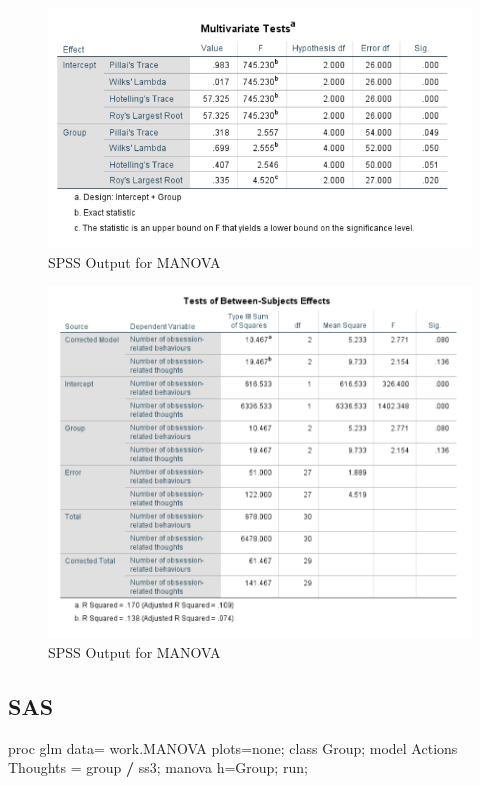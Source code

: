 \documentclass[
]{book}
\newenvironment{Shaded}{\begin{snugshade}}{\end{snugshade}}
\newcommand{\NormalTok}[1]{#1}
\newcommand{\OperatorTok}[1]{\textcolor[rgb]{0.81,0.36,0.00}{\textbf{#1}}}
\newcommand{\StringTok}[1]{\textcolor[rgb]{0.31,0.60,0.02}{#1}}
\begin{document}
\begin{figure}[!h]
\includegraphics{Screenshots/MANOVA/MANOVAspss} \caption{\label{fig:manovaSPSS}SPSS Output for MANOVA}\label{fig:manovaSPSS}
\end{figure}

\begin{figure}[!h]
\includegraphics{Screenshots/MANOVA/ANOVASspss} \caption{\label{fig:manovaSPSS2}SPSS Output for MANOVA}\label{fig:manovaSPSS2}
\end{figure}

\hypertarget{sas-6}{%
\subsection{SAS}\label{sas-6}}

\begin{Shaded}
\begin{Highlighting}[]
\NormalTok{proc glm data=}\StringTok{ }\NormalTok{work.MANOVA plots=none;}
\NormalTok{  class Group;}
\NormalTok{  model Actions Thoughts =}\StringTok{ }\NormalTok{group }\OperatorTok{/}\StringTok{ }\NormalTok{ss3;}
\NormalTok{  manova h=Group;}
\NormalTok{run;}
\end{Highlighting}
\end{Shaded}
\end{document}
